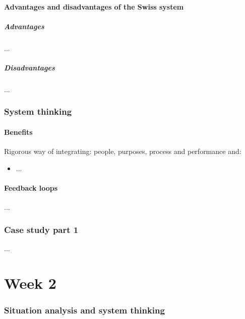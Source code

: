 \documentclass{article}
\begin{document}
\subsection{Advantages and disadvantages of the Swiss system}
\subsubsection{Advantages}
...

\subsubsection{Disadvantages}
...

\section{System thinking}
\subsection{Benefits}
Rigorous way of integrating: people, purposes, process and performance and:
\begin{itemize}
    \item ...
\end{itemize}

\subsection{Feedback loops}
...

\section{Case study part 1}
...

\part{Week 2}
\section{Situation analysis and system thinking}
\end{document}
